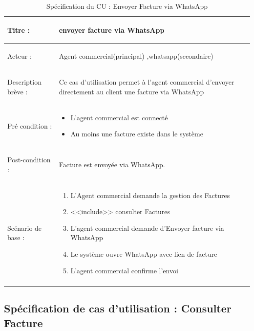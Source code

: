 \begin{longtable}{|>{\bfseries\raggedright\arraybackslash}p{3.5cm}|p{\dimexpr\textwidth-3.5cm-4\tabcolsep-2\arrayrulewidth}|}
\hline
Titre : & envoyer facture via WhatsApp \\
\hline
Acteur : & Agent commercial(principal)
,whatsapp(secondaire) \\
\hline
Description brève : & Ce cas d'utilisation permet à l'agent commercial d'envoyer directement au client une facture via WhatsApp \\
\hline
Pré condition : &
\begin{itemize}[leftmargin=1.5em, topsep=0pt, itemsep=0pt, parsep=0pt]
  \item L'agent commercial est connecté
  \item Au moins une facture existe dans le système
\end{itemize} \\
\hline
Post-condition : & Facture est envoyée via WhatsApp. \\
\hline
Scénario de base : &
\begin{enumerate}[leftmargin=1.5em, topsep=2pt, itemsep=1pt]
  \item L'Agent commercial demande la gestion des Factures
  \item <<include>> consulter Factures
  \item L'agent commercial demande d'Envoyer facture via WhatsApp
  \item Le système ouvre WhatsApp avec lien de facture
  \item L'agent commercial confirme l'envoi
\end{enumerate} \\
\hline
\caption{Spécification du CU : Envoyer Facture via WhatsApp}
\label{tab:cu-envoyer-whatsapp}
\end{longtable}

\subsection{Spécification de cas d'utilisation : Consulter Facture}

